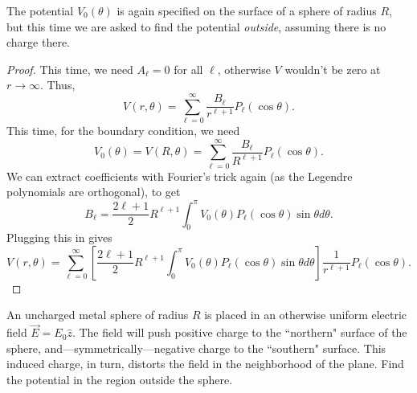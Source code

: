 \begin{example}
The potential $V_0(\theta)$ is again specified on the surface of a sphere of radius $R$, but this time we are asked to find the potential \textit{outside}, assuming there is no charge there.
\end{example}

\begin{proof}
This time, we need $A_\ell=0$ for all $\ell$, otherwise $V$ wouldn't be zero at $r\to\infty$. Thus,
\[V(r,\theta)=\sum_{\ell=0}^\infty \frac{B_\ell}{r^{\ell+1}}P_\ell(\cos\theta).\]
This time, for the boundary condition, we need
\[V_0(\theta)=V(R,\theta)=\sum_{\ell=0}^\infty \frac{B_\ell}{R^{\ell+1}}P_\ell(\cos\theta).\]
We can extract coefficients with Fourier's trick again (as the Legendre polynomials are orthogonal), to get
\[B_\ell=\frac{2\ell+1}{2}R^{\ell+1}\int_0^\pi V_0(\theta)P_{\ell}(\cos\theta)\sin\theta d\theta.\]
Plugging this in gives
\[\boxed{V(r,\theta)=\sum_{\ell=0}^\infty \left[\frac{2\ell+1}{2}R^{\ell+1}\int_0^\pi V_0(\theta)P_{\ell}(\cos\theta)\sin\theta d\theta\right]\frac{1}{r^{\ell+1}}P_\ell(\cos\theta)}.\]


\end{proof}

\begin{example}\label{sphereinfield}
An uncharged metal sphere of radius $R$ is placed in an otherwise uniform electric field $\vec{E}=E_0\hat{z}$. The field will push positive charge to the ``northern" surface of the sphere, and---symmetrically---negative charge to the ``southern" surface. This induced charge, in turn, distorts the field in the neighborhood of the plane. Find the potential in the region outside the sphere.
\end{example}

